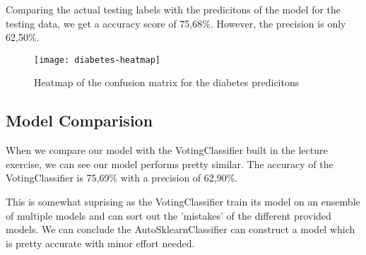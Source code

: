 Comparing the actual testing labels with the predicitons of the model for the testing data, we get a accuracy score of 75,68\%. However, the precision is only 62,50\%.

\begin{figure}[t]
  \begin{center}
    \texttt{[image: diabetes-heatmap]}
    \caption{Heatmap of the confusion matrix for the diabetes predicitons}
  \end{center}
\end{figure}

\subsection{Model Comparision}

When we compare our model with the VotingClassifier built in the lecture exercise, we can see our model performs pretty similar. The accuracy of the VotingClassifier is 75,69\% with a precision of 62,90\%.

This is somewhat suprising as the VotingClassifier train its model on an ensemble of multiple models and can sort out the 'mistakes' of the different provided models. We can conclude the AutoSklearnClassifier can construct a model which is pretty accurate with minor effort needed.
